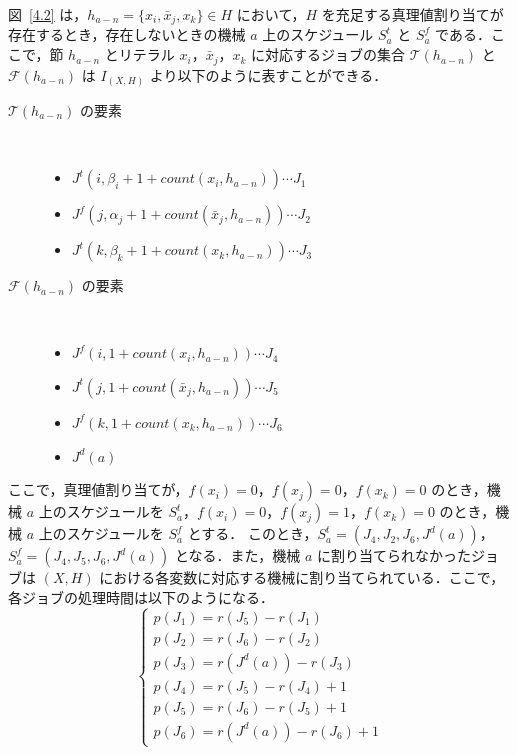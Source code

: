 \documentclass[12pt]{optlab-bachelor}
\begin{document}
図~\ref{4.2} は，$h_{a - n} = \{x_i, \bar x_j, x_k\} \in H$ において，$H$ を充足する真理値割り当てが存在するとき，存在しないときの機械 $a$ 上のスケジュール $S^t_a$ と $S^f_a$ である．ここで，節 $h_{a - n}$ とリテラル $x_i$，$\bar x_j$，$x_k$ に対応するジョブの集合 $\mathcal{T}(h_{a - n})$ と $\mathcal{F}(h_{a - n})$ は $I_{(X,H)}$ より以下のように表すことができる．
\begin{description}
  \item[$\mathcal{T}(h_{a - n})$ の要素] ~
  \begin{itemize}
    \item $J^t(i, \beta_i + 1 + count(x_i, h_{a - n})) \cdots J_1$
    \item $J^f(j, \alpha_j + 1 + count(\bar x_j, h_{a - n})) \cdots J_2$
    \item $J^t(k, \beta_k + 1 + count(x_k, h_{a - n})) \cdots J_3$
  \end{itemize}
  \item[$\mathcal{F}(h_{a - n})$ の要素] ~
  \begin{itemize}
    \item $J^f(i, 1 + count(x_i, h_{a - n})) \cdots J_4$
    \item $J^t(j, 1 + count(\bar x_j, h_{a - n})) \cdots J_5$
    \item $J^f(k, 1 + count(x_k, h_{a - n})) \cdots J_6$
    \item $J^d(a)$
  \end{itemize}
\end{description}
ここで，真理値割り当てが，$f(x_i) = 0$，$f(x_j) = 0$，$f(x_k) = 0$ のとき，機械 $a$ 上のスケジュールを $S^t_a$，$f(x_i) = 0$，$f(x_j) = 1$，$f(x_k) = 0$ のとき，機械 $a$ 上のスケジュールを $S^f_a$ とする．
このとき，$S^t_a = (J_4, J_2, J_6, J^d(a))$，$S^f_a = (J_4, J_5, J_6, J^d(a))$ となる．また，機械 $a$ に割り当てられなかったジョブは $(X,H)$ における各変数に対応する機械に割り当てられている．ここで，各ジョブの処理時間は以下のようになる．
\begin{displaymath}
  \left\{ \begin{array}{llllll}
  p(J_1) = r(J_5) - r(J_1) \\
  p(J_2) = r(J_6) - r(J_2) \\
  p(J_3) = r(J^d(a)) - r(J_3) \\
  p(J_4) = r(J_5) - r(J_4) + 1\\
  p(J_5) = r(J_6) - r(J_5)  + 1\\
  p(J_6) = r(J^d(a)) - r(J_6) + 1
  \end{array} \right.
\end{displaymath}
\end{document}
